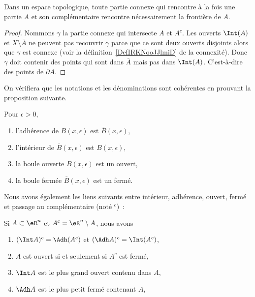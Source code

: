 \begin{lemma}        \label{LEMooLKWEooItGnkP}
    Dans un espace topologique, toute partie connexe qui rencontre à la fois une partie \( A\) et son complémentaire rencontre nécessairement la frontière de \( A\).
\end{lemma}

\begin{proof}
    Nommons \( \gamma\) la partie connexe qui intersecte \( A\) et \( A^c\). Les ouverts \( \Int(A)\) et \( X\setminus \bar A\) ne peuvent pas recouvrir \( \gamma\) parce que ce sont deux ouverts disjoints alors que \( \gamma\) est connexe (voir la définition~\ref{DefIRKNooJJlmiD} de la connexité). Donc \( \gamma\) doit contenir des points qui sont dans \( \bar A\) mais pas dans \( \Int(A)\). C'est-à-dire des points de \( \partial A\).
\end{proof}

On vérifiera que les notations et les dénominations sont cohérentes en prouvant la proposition suivante.
\begin{proposition}Pour $\epsilon > 0$,
  \begin{enumerate}
  \item l'adhérence de $B(x,\epsilon)$ est $\bar B(x,\epsilon)$,
  \item l'intérieur de $\bar B(x,\epsilon)$ est $B(x,\epsilon)$,
  \item la boule ouverte $B(x,\epsilon)$ est un ouvert,
  \item la boule fermée $\bar B(x,\epsilon)$ est un fermé.
  \end{enumerate}
\end{proposition}

Nous avons également les liens suivants entre intérieur, adhérence, ouvert, fermé et passage au complémentaire (noté ${}^c$)~:
\begin{proposition}
Si $A \subset \eR^n$ et $A^c = \eR^n\setminus A$, nous
  avons
  \begin{enumerate}
  \item $(\Int A)^c = \Adh (A^c)$ et $(\Adh A)^c = \Int
    (A^c)$,
  \item $A$ est ouvert si et seulement si $A^c$ est fermé,
  \item $\Int A$ est le plus grand ouvert contenu dans $A$,
  \item $\Adh A$ est le plus petit fermé contenant $A$,
  \end{enumerate}
\end{proposition}


